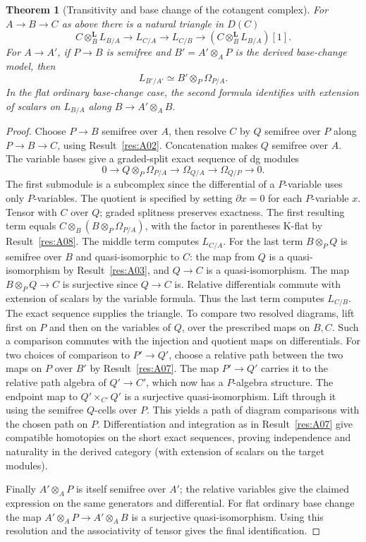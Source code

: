 \documentclass[11pt,oneside,openany]{book}
\newtheorem{theorem}{Theorem}[chapter]
\theoremstyle{definition}
\theoremstyle{remark}
\begin{document}
\begin{theorem}[Transitivity and base change of the cotangent complex]\label{res:A09}
For \(A\to B\to C\) as above there is a natural triangle in \(D(C)\)
\[
 C\otimes_B^{\mathbf L}L_{B/A}\longrightarrow L_{C/A}
 \longrightarrow L_{C/B}\longrightarrow
 (C\otimes_B^{\mathbf L}L_{B/A})[1].
\]
For \(A\to A'\), if \(P\to B\) is semifree and
\(B'=A'\otimes_A P\) is the derived base-change model, then
\[
       L_{B'/A'}\simeq B'\otimes_P \Omega_{P/A}.
\]
In the flat ordinary base-change case, the second formula identifies
with extension of scalars on \(L_{B/A}\) along \(B\to A'\otimes_A B\).
\end{theorem}
\begin{proof}
Choose \(P\to B\) semifree over \(A\), then resolve \(C\) by \(Q\)
semifree over \(P\) along \(P\to B\to C\), using
Result~\ref{res:A02}. Concatenation makes \(Q\) semifree over \(A\).
The variable bases give a graded-split exact sequence of dg modules
\[
 0\longrightarrow Q\otimes_P\Omega_{P/A}
 \longrightarrow \Omega_{Q/A}
 \longrightarrow \Omega_{Q/P}\longrightarrow0 .
\]
The first submodule is a subcomplex since the differential of
a \(P\)-variable uses only \(P\)-variables. The quotient is specified
by setting \(\partial x=0\) for each \(P\)-variable \(x\).
Tensor with \(C\) over \(Q\); graded splitness preserves exactness.
The first resulting term equals
\(C\otimes_B(B\otimes_P\Omega_{P/A})\), with the factor in parentheses
K-flat by Result~\ref{res:A08}. The middle term computes \(L_{C/A}\).
For the last term \(B\otimes_P Q\) is semifree over \(B\) and
quasi-isomorphic to \(C\): the map from \(Q\) is a quasi-isomorphism
by Result~\ref{res:A03}, and \(Q\to C\) is a quasi-isomorphism.
The map \(B\otimes_PQ\to C\) is surjective since \(Q\to C\) is.
Relative differentials commute with extension of scalars by the
variable formula. Thus the last term computes \(L_{C/B}\).
The exact sequence supplies the triangle. To compare two resolved
diagrams, lift first on \(P\) and then on the variables of \(Q\),
over the prescribed maps on \(B,C\). Such a comparison commutes
with the injection and quotient maps on differentials. For two
choices of comparison to \(P'\to Q'\), choose a relative path
between the two maps on \(P\) over \(B'\) by
Result~\ref{res:A07}. The map \(P'\to Q'\) carries it to the
relative path algebra of \(Q'\to C'\), which now has a \(P\)-algebra
structure. The endpoint map to \(Q'\times_{C'}Q'\) is a surjective
quasi-isomorphism. Lift through it using the semifree \(Q\)-cells
over \(P\). This yields a path of diagram comparisons with the
chosen path on \(P\). Differentiation and integration as in
Result~\ref{res:A07} give compatible homotopies on the short exact
sequences, proving independence and naturality in the derived
category (with extension of scalars on the target modules).

Finally \(A'\otimes_A P\) is itself semifree over \(A'\);
the relative variables give the claimed expression on the same
generators and differential. For flat ordinary base change the
map \(A'\otimes_A P\to A'\otimes_A B\) is a surjective
quasi-isomorphism. Using this resolution and the associativity
of tensor gives the final identification.
\end{proof}
\end{document}
